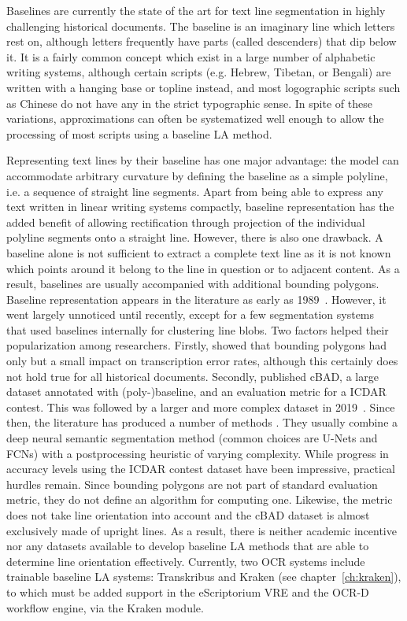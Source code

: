 Baselines are currently the state of the art for text line segmentation in
highly challenging historical documents. The baseline is an imaginary line
which letters rest on, although letters frequently have parts (called
descenders) that dip below it. It is a fairly common concept which exist in a
large number of alphabetic writing systems, although certain scripts (e.g.
Hebrew, Tibetan, or Bengali) are written with a hanging base or topline
instead, and most logographic scripts such as Chinese do not have any in the
strict typographic sense. In spite of these variations, approximations can
often be systematized well enough to allow the processing of most scripts using
a baseline LA method.

Representing text lines by their baseline has one major advantage: the model
can accommodate arbitrary curvature by defining the baseline as a simple
polyline, i.e. a sequence of straight line segments. Apart from being able to
express any text written in linear writing systems compactly, baseline
representation has the added benefit of allowing rectification through
projection of the individual polyline segments onto a straight line. However,
there is also one drawback. A baseline alone is not sufficient to extract a
complete text line as it is not known which points around it belong to the line
in question or to adjacent content. As a result, baselines are usually
accompanied with additional bounding polygons. Baseline representation appears
in the literature as early as 1989~\cite{srihari1989analysis}. However, it went
largely unnoticed until recently, except for a few segmentation systems~\cite{Breuel03highperformance,smith2007overview} that used baselines internally
for clustering line blobs. Two factors helped their popularization among
researchers. Firstly, \cite{romero2015influence} showed that bounding polygons
had only but a small impact on transcription error rates, although this
certainly does not hold true for all historical documents. Secondly,
\cite{diem2017cbad} published cBAD, a large dataset annotated with
(poly-)baseline, and an evaluation metric for a ICDAR contest. This was
followed by a larger and more complex dataset in 2019~\cite{diem_markus_2019_3568023}. Since then, the literature has produced a
number of methods
\cite{xu2018multi,quiros2018multi,mechi2019text,oliveira2018dhsegment,romain2019semi,gruning2019two,melnikov2020fast}.
They usually combine a deep neural semantic segmentation method (common choices
are U-Nets and FCNs) with a postprocessing heuristic of varying complexity.
While progress in accuracy levels using the ICDAR contest dataset have been
impressive, practical hurdles remain. Since bounding polygons are not part of
standard evaluation metric, they do not define an algorithm for computing one.
Likewise, the metric does not take line orientation into account and the cBAD
dataset is almost exclusively made of upright lines. As a result, there is
neither academic incentive nor any datasets available to develop baseline LA
methods that are able to determine line orientation effectively. Currently, two
OCR systems include trainable baseline LA systems: Transkribus and Kraken (see
chapter~\ref{ch:kraken}), to which must be added support in the eScriptorium
VRE and the OCR-D workflow engine, via the Kraken module.

